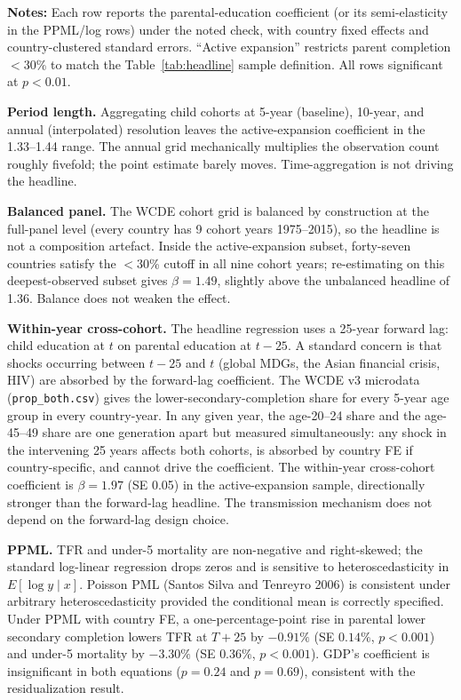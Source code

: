 \documentclass[12pt,letterpaper]{article}
\begin{document}
{\begin{minipage}{\dimexpr\textwidth-2em}
\scriptsize
\textbf{Notes:} Each row reports the parental-education coefficient
(or its semi-elasticity in the PPML/log rows) under the noted check,
with country fixed effects and country-clustered standard errors.
``Active expansion'' restricts parent completion $<30\%$ to match
the Table~\ref{tab:headline} sample definition. All rows significant at
$p<0.01$.
\end{minipage}

\textbf{Period length.} Aggregating child cohorts at 5-year (baseline),
10-year, and annual (interpolated) resolution leaves the active-expansion
coefficient in the 1.33--1.44 range. The annual grid mechanically
multiplies the observation count roughly fivefold; the point estimate
barely moves. Time-aggregation is not driving the headline.

\textbf{Balanced panel.} The WCDE cohort grid is balanced by
construction at the full-panel level (every country has 9 cohort years
1975--2015), so the headline is not a composition artefact. Inside the
active-expansion subset, forty-seven countries satisfy the $<30$\% cutoff
in all nine cohort years; re-estimating on this deepest-observed subset
gives $\beta=1.49$, slightly above the unbalanced headline of 1.36.
Balance does not weaken the effect.

\textbf{Within-year cross-cohort.} The headline regression uses a 25-year
forward lag: child education at $t$ on parental education at $t-25$. A
standard concern is that shocks occurring between $t-25$ and $t$
(global MDGs, the Asian financial crisis, HIV) are absorbed by the
forward-lag coefficient. The WCDE v3 microdata
(\texttt{prop\_both.csv}) gives the lower-secondary-completion share
for every 5-year age group in every country-year. In any given year,
the age-20--24 share and the age-45--49 share are one generation apart
but measured simultaneously: any shock in the intervening 25 years
affects both cohorts, is absorbed by country FE if country-specific,
and cannot drive the coefficient. The within-year cross-cohort
coefficient is $\beta=1.97$ (SE 0.05) in the active-expansion sample,
directionally stronger than the forward-lag headline. The transmission
mechanism does not depend on the forward-lag design choice.

\textbf{PPML.} TFR and under-5 mortality are non-negative and right-skewed;
the standard log-linear regression drops zeros and is sensitive to
heteroscedasticity in $E[\log y \mid x]$. Poisson PML (Santos Silva and
Tenreyro 2006) is consistent under arbitrary heteroscedasticity provided
the conditional mean is correctly specified. Under PPML with country FE,
a one-percentage-point rise in parental lower secondary completion
lowers TFR at $T+25$ by $-0.91\%$ (SE $0.14\%$, $p<0.001$) and under-5
mortality by $-3.30\%$ (SE $0.36\%$, $p<0.001$). GDP's coefficient is
insignificant in both equations ($p=0.24$ and $p=0.69$), consistent
with the residualization result.

}
\end{document}
